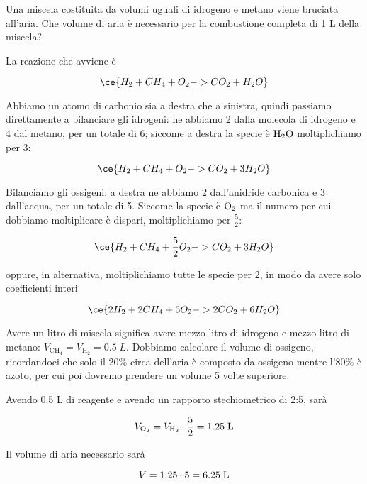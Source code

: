\begin{esercizio}[$\bigstar$]
    Una miscela costituita da volumi uguali di idrogeno e metano viene bruciata all'aria\footnotemark. Che volume di aria è necessario per la combustione completa di 1 L della miscela?
\end{esercizio}
\begin{soluzione}
    La reazione che avviene è

$$\ce{H_2 + CH_4 + O_2 -> CO_2 + H_2O}$$

Abbiamo un atomo di carbonio sia a destra che a sinistra, quindi passiamo direttamente a bilanciare gli idrogeni: ne abbiamo 2 dalla molecola di idrogeno e 4 dal metano, per un totale di 6; siccome a destra la specie è $\rm H_2O$ moltiplichiamo per 3:

$$\ce{H_2 + CH_4 + O_2 -> CO_2 + 3H_2O}$$

Bilanciamo gli ossigeni: a destra ne abbiamo 2 dall'anidride carbonica e 3 dall'acqua, per un totale di 5. Siccome la specie è $\rm O_2$ ma il numero per cui dobbiamo moltiplicare è dispari, moltiplichiamo per $\frac{5}{2}$:

$$\ce{H_2 + CH_4 + \frac{5}{2}O_2 -> CO_2 + 3H_2O}$$

oppure, in alternativa, moltiplichiamo tutte le specie per 2, in modo da avere solo coefficienti interi

$$\ce{2H_2 + 2CH_4 + 5O_2 -> 2CO_2 + 6H_2O}$$

Avere un litro di miscela significa avere mezzo litro di idrogeno e mezzo litro di metano: $V_{\text{CH}_4}=V_{\text{H}_2}=0.5\;L$. Dobbiamo calcolare il volume di ossigeno, ricordandoci che solo il 20\% circa dell'aria è composto da ossigeno mentre l'80\% è azoto, per cui poi dovremo prendere un volume 5 volte superiore.

Avendo 0.5 L di reagente e avendo un rapporto stechiometrico di 2:5, sarà

$$V_{\text{O}_2}=V_{\text{H}_2}\cdot\frac{5}{2}=1.25 \; \rm L$$

Il volume di aria necessario sarà

$$V=1.25 \cdot 5 = 6.25 \; \rm L$$
\end{soluzione}

\newpage

